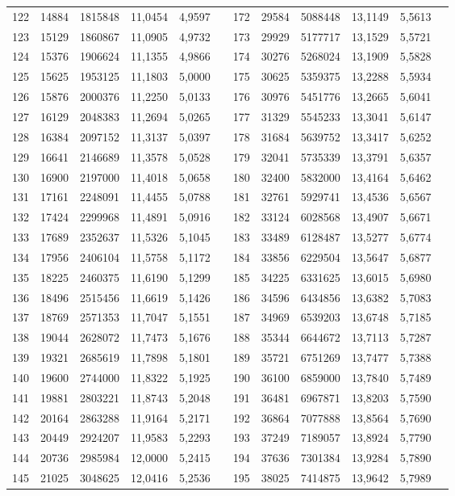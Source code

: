 \begin{longtable}{p{.17\linewidth}*{11}{S}}
122&14884&1815848&11,0454&4,9597&&172&29584&5088448&13,1149&5,5613\\
123&15129&1860867&11,0905&4,9732&&173&29929&5177717&13,1529&5,5721\\
124&15376&1906624&11,1355&4,9866&&174&30276&5268024&13,1909&5,5828\\
125&15625&1953125&11,1803&5,0000&&175&30625&5359375&13,2288&5,5934\\
126&15876&2000376&11,2250&5,0133&&176&30976&5451776&13,2665&5,6041\\
127&16129&2048383&11,2694&5,0265&&177&31329&5545233&13,3041&5,6147\\
128&16384&2097152&11,3137&5,0397&&178&31684&5639752&13,3417&5,6252\\
129&16641&2146689&11,3578&5,0528&&179&32041&5735339&13,3791&5,6357\\
130&16900&2197000&11,4018&5,0658&&180&32400&5832000&13,4164&5,6462\\
131&17161&2248091&11,4455&5,0788&&181&32761&5929741&13,4536&5,6567\\
132&17424&2299968&11,4891&5,0916&&182&33124&6028568&13,4907&5,6671\\
133&17689&2352637&11,5326&5,1045&&183&33489&6128487&13,5277&5,6774\\
134&17956&2406104&11,5758&5,1172&&184&33856&6229504&13,5647&5,6877\\
135&18225&2460375&11,6190&5,1299&&185&34225&6331625&13,6015&5,6980\\
136&18496&2515456&11,6619&5,1426&&186&34596&6434856&13,6382&5,7083\\
137&18769&2571353&11,7047&5,1551&&187&34969&6539203&13,6748&5,7185\\
138&19044&2628072&11,7473&5,1676&&188&35344&6644672&13,7113&5,7287\\
139&19321&2685619&11,7898&5,1801&&189&35721&6751269&13,7477&5,7388\\
140&19600&2744000&11,8322&5,1925&&190&36100&6859000&13,7840&5,7489\\
141&19881&2803221&11,8743&5,2048&&191&36481&6967871&13,8203&5,7590\\
142&20164&2863288&11,9164&5,2171&&192&36864&7077888&13,8564&5,7690\\
143&20449&2924207&11,9583&5,2293&&193&37249&7189057&13,8924&5,7790\\
144&20736&2985984&12,0000&5,2415&&194&37636&7301384&13,9284&5,7890\\
145&21025&3048625&12,0416&5,2536&&195&38025&7414875&13,9642&5,7989\\

\end{longtable}
